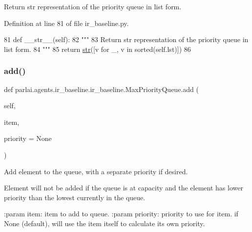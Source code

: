 \begin{DoxyVerb}Return str representation of the priority queue in list form.
\end{DoxyVerb}
 

Definition at line 81 of file ir\+\_\+baseline.\+py.


\begin{DoxyCode}
81     \textcolor{keyword}{def }\_\_str\_\_(self):
82         \textcolor{stringliteral}{"""}
83 \textcolor{stringliteral}{        Return str representation of the priority queue in list form.}
84 \textcolor{stringliteral}{        """}
85         \textcolor{keywordflow}{return} \hyperlink{namespacegenerate__task__READMEs_a5b88452ffb87b78c8c85ececebafc09f}{str}([v \textcolor{keywordflow}{for} \_, v \textcolor{keywordflow}{in} sorted(self.lst)])
86 
\end{DoxyCode}
\mbox{\label{classparlai_1_1agents_1_1ir__baseline_1_1ir__baseline_1_1MaxPriorityQueue_ad55d735d26bc038f7a552b1789036033}} 
\subsubsection{\texorpdfstring{add()}{add()}}
{\footnotesize\ttfamily def parlai.\+agents.\+ir\+\_\+baseline.\+ir\+\_\+baseline.\+Max\+Priority\+Queue.\+add (\begin{DoxyParamCaption}\item[{}]{self,  }\item[{}]{item,  }\item[{}]{priority = {\ttfamily None} }\end{DoxyParamCaption})}

\begin{DoxyVerb}Add element to the queue, with a separate priority if desired.

Element will not be added if the queue is at capacity and the element
has lower priority than the lowest currently in the queue.

:param item: item to add to queue.
:param priority: priority to use for item. if None (default), will use
         the item itself to calculate its own priority.
\end{DoxyVerb}
 

